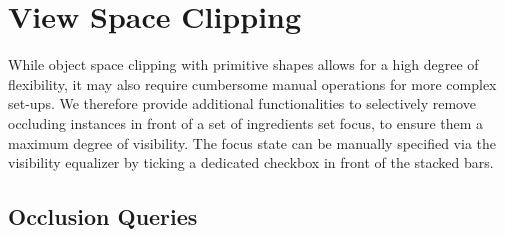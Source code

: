 \vspace{-2mm}
\section{View Space Clipping}

While object space clipping with primitive shapes allows for a high degree of flexibility, it may also require cumbersome manual operations for more complex set-ups.
We therefore provide additional functionalities to selectively remove occluding instances in front of a set of ingredients set focus, to ensure them a maximum degree of visibility.
The focus state can be manually specified via the visibility equalizer by ticking a dedicated checkbox in front of the stacked bars.

\vspace{-2mm}
\subsection{Occlusion Queries}
\label{sec:OQ}

